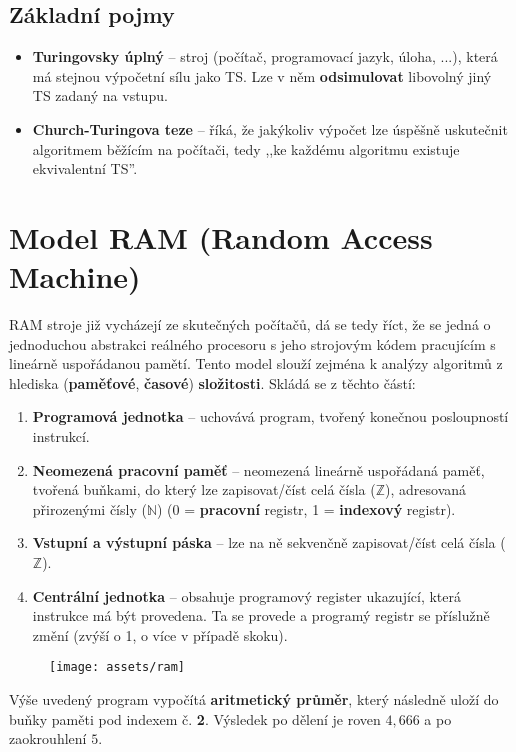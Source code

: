 \subsection{Základní pojmy}
\begin{itemize}
    \item \textbf{Turingovsky úplný} -- stroj (počítač, programovací jazyk, úloha, ...), která má stejnou výpočetní sílu jako TS. Lze v něm \textbf{odsimulovat} libovolný jiný TS zadaný na vstupu.
    \item \textbf{Church-Turingova teze} -- říká, že jakýkoliv výpočet lze úspěšně uskutečnit algoritmem běžícím na počítači, tedy ,,ke každému algoritmu existuje ekvivalentní TS''.
\end{itemize}

\section{Model RAM (Random Access Machine)}
RAM stroje již vycházejí ze skutečných počítačů, dá se tedy říct, že se jedná o jednoduchou abstrakci reálného procesoru s jeho strojovým kódem pracujícím s lineárně uspořádanou pamětí. Tento model slouží zejména k analýzy algoritmů z hlediska (\textbf{paměťové}, \textbf{časové}) \textbf{složitosti}. Skládá se z těchto částí:
\begin{enumerate}
    \item \textbf{Programová jednotka} -- uchovává program, tvořený konečnou posloupností instrukcí.
    \item \textbf{Neomezená pracovní paměť} -- neomezená lineárně uspořádaná paměť, tvořená buňkami, do který lze zapisovat/číst celá čísla ($\mathbb{Z}$), adresovaná přirozenými čísly ($\mathbb{N}$) (0 = \textbf{pracovní} registr, 1 = \textbf{indexový} registr).
    \item \textbf{Vstupní a výstupní páska} -- lze na ně sekvenčně zapisovat/číst celá čísla ($\mathbb{Z}$).
    \item \textbf{Centrální jednotka} -- obsahuje programový register ukazující, která instrukce má být provedena. Ta se provede a programý registr se příslužně změní (zvýší o 1, o více v případě skoku).
\end{enumerate}

\begin{figure}[!ht]
    \centering
    \texttt{[image: assets/ram]}
\end{figure}

Výše uvedený program vypočítá \textbf{aritmetický průměr}, který následně uloží do buňky paměti pod indexem č. \textbf{2}. Výsledek po dělení je roven $4,666$ a po zaokrouhlení $5$.

